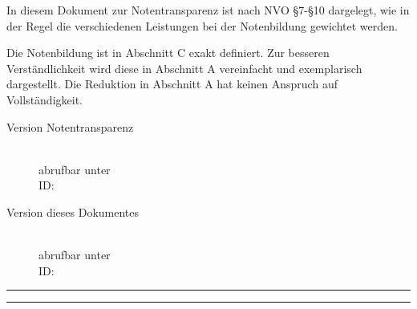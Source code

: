 \documentclass{article}
\newcommand{\versiondir}{_version}
\begin{document}
	\vspace*{-1cm}
	In diesem Dokument zur Notentransparenz ist nach NVO §7-§10 dargelegt, wie in der Regel die verschiedenen Leistungen bei der Notenbildung gewichtet werden.

	Die Notenbildung ist in Abschnitt C exakt definiert. Zur besseren Verständlichkeit wird diese in Abschnitt A vereinfacht und exemplarisch dargestellt. Die Reduktion in Abschnitt A hat keinen Anspruch auf Vollständigkeit.

	\begin{description}
		\item[Version Notentransparenz] \\abrufbar unter \\ ID: 
		\item[Version dieses Dokumentes] \\abrufbar unter \\ ID: 
	\end{description}
		
	\rule{\linewidth}{2pt}
	\renewcommand{\contentsname}{Abschnitte der Notentransparenz}
	\tableofcontents
	\rule{\linewidth}{2pt}
	
	
	
	\vspace{0.2cm}

	

	\clearpage
	
\end{document}
